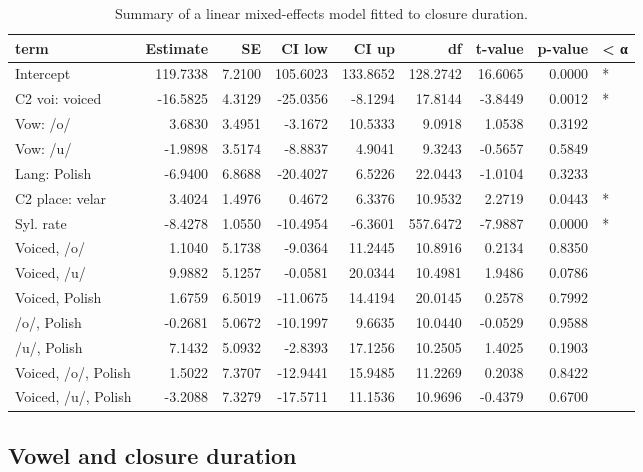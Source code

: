 \documentclass[preprint]{JASAnew}
\begin{document}
\begin{table}

\caption{\label{tab:clo-table}Summary of a linear mixed-effects model fitted to closure duration.}
\centering
\begin{tabular}[t]{lrrrrrrrl}
\toprule
term & Estimate & SE & CI low & CI up & df & t-value & p-value & < α\\
\midrule
Intercept & 119.7338 & 7.2100 & 105.6023 & 133.8652 & 128.2742 & 16.6065 & 0.0000 & *\\
C2 voi: voiced & -16.5825 & 4.3129 & -25.0356 & -8.1294 & 17.8144 & -3.8449 & 0.0012 & *\\
Vow: /o/ & 3.6830 & 3.4951 & -3.1672 & 10.5333 & 9.0918 & 1.0538 & 0.3192 & \\
Vow: /u/ & -1.9898 & 3.5174 & -8.8837 & 4.9041 & 9.3243 & -0.5657 & 0.5849 & \\
Lang: Polish & -6.9400 & 6.8688 & -20.4027 & 6.5226 & 22.0443 & -1.0104 & 0.3233 & \\
\addlinespace
C2 place: velar & 3.4024 & 1.4976 & 0.4672 & 6.3376 & 10.9532 & 2.2719 & 0.0443 & *\\
Syl. rate & -8.4278 & 1.0550 & -10.4954 & -6.3601 & 557.6472 & -7.9887 & 0.0000 & *\\
Voiced, /o/ & 1.1040 & 5.1738 & -9.0364 & 11.2445 & 10.8916 & 0.2134 & 0.8350 & \\
Voiced, /u/ & 9.9882 & 5.1257 & -0.0581 & 20.0344 & 10.4981 & 1.9486 & 0.0786 & \\
Voiced, Polish & 1.6759 & 6.5019 & -11.0675 & 14.4194 & 20.0145 & 0.2578 & 0.7992 & \\
\addlinespace
/o/, Polish & -0.2681 & 5.0672 & -10.1997 & 9.6635 & 10.0440 & -0.0529 & 0.9588 & \\
/u/, Polish & 7.1432 & 5.0932 & -2.8393 & 17.1256 & 10.2505 & 1.4025 & 0.1903 & \\
Voiced, /o/, Polish & 1.5022 & 7.3707 & -12.9441 & 15.9485 & 11.2269 & 0.2038 & 0.8422 & \\
Voiced, /u/, Polish & -3.2088 & 7.3279 & -17.5711 & 11.1536 & 10.9696 & -0.4379 & 0.6700 & \\
\bottomrule
\end{tabular}
\end{table}

\hypertarget{vowel-and-closure-duration-1}{%
\subsection{Vowel and closure
duration}\label{vowel-and-closure-duration-1}}
\end{document}
